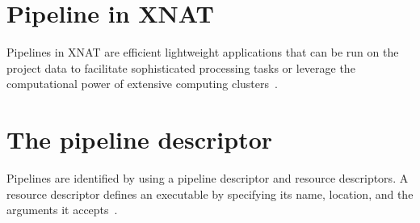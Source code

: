 \section{Pipeline in XNAT}
Pipelines in XNAT are efficient lightweight applications that can be run on the project data to facilitate sophisticated processing tasks or leverage the computational power of extensive computing clusters~\cite{Pipeline}.

\section{The pipeline descriptor}

Pipelines are identified by using a pipeline descriptor and resource descriptors. A resource descriptor defines an executable by specifying its name, location, and the arguments it accepts~\cite{XNAT_Pipeline_Development_Schema}. 








